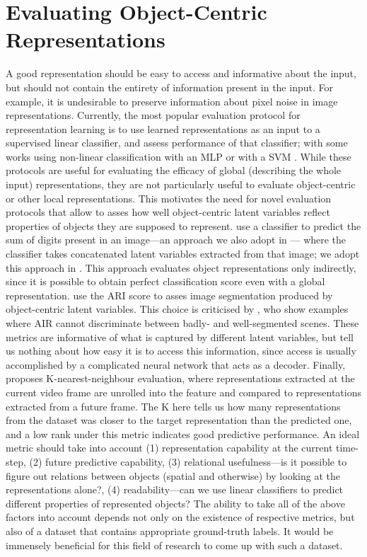 \section{Evaluating Object-Centric Representations}
A good representation should be easy to access and informative about the input, but should not contain the entirety of information present in the input.
For example, it is undesirable to preserve information about pixel noise in image representations.
Currently, the most popular evaluation protocol for representation learning is to use learned representations as an input to a supervised linear classifier, and assess performance of that classifier; with some works using non-linear classification with an \gls{MLP} \citep{Henaff2019efficient} or with a \gls{SVM} \citep{Hjelm2019deepinfomax}.
While these protocols are useful for evaluating the efficacy of global (describing the whole input) representations, they are not particularly useful to evaluate object-centric or other local representations.
This motivates the need for novel evaluation protocols that allow to asses how well object-centric latent variables reflect properties of objects they are supposed to represent.
\cite{Eslami2016air} use a classifier to predict the sum of digits present in an image---an approach we also adopt in --- where the classifier takes concatenated latent variables extracted from that image; we adopt this approach in .
This approach evaluates object representations only indirectly, since it is possible to obtain perfect classification score even with a global representation.
\cite{Burgess2019monet,Greff2019multi} use the \gls{ARI} score to asses image segmentation produced by object-centric latent variables.
This choice is criticised by 
\cite{Engelcke2019genesis}, who show examples where \gls{AIR} cannot discriminate between badly- and well-segmented scenes.
These metrics are informative of what is captured by different latent variables, but tell us nothing about how easy it is to access this information, since access is usually accomplished by a complicated neural network that acts as a decoder.
Finally, \cite{Kipf2019cswm} proposes K-nearest-neighbour evaluation, where representations extracted at the current video frame are unrolled into the feature and compared to representations extracted from a future frame. The K here tells us how many representations from the dataset was closer to the target representation than the predicted one, and a low rank under this metric indicates good predictive performance.
An ideal metric should take into account
	(1) representation capability at the current time-step,
	(2) future predictive capability,
	(3) relational usefulness---is it possible to figure out relations between objects (spatial and otherwise) by looking at the representations alone?,
	(4) readability---can we use linear classifiers to predict different properties of represented objects?
%
The ability to take all of the above factors into account depends not only on the existence of respective metrics, but also of a dataset that contains appropriate ground-truth labels.
It would be immensely beneficial for this field of research to come up with such a dataset.

